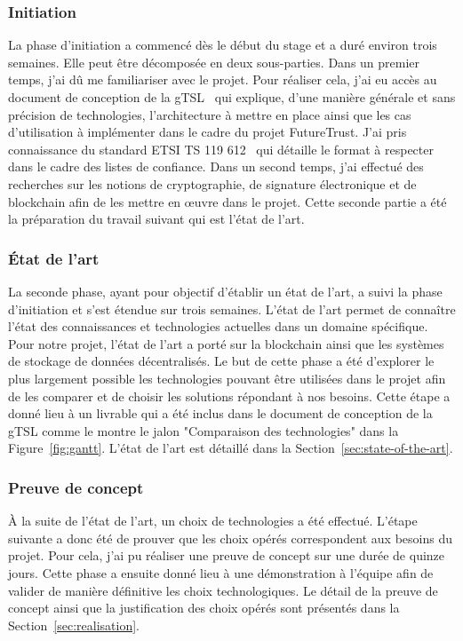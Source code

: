 \documentclass{tnreport}
\begin{document}
\subsubsection{Initiation}

La phase d'initiation a commencé dès le début du stage et a duré environ trois semaines. 
Elle peut être décomposée en deux sous-parties. Dans un premier temps, j'ai dû me familiariser avec le projet. Pour réaliser cela, j'ai eu accès au document de conception de la gTSL~\cite{design-document} qui explique, d'une manière générale et sans précision de technologies, l'architecture à mettre en place ainsi que les cas d'utilisation à implémenter dans le cadre du projet FutureTrust. J'ai pris connaissance du standard ETSI TS 119 612~\cite{ETSITS119612} qui détaille le format à respecter dans le cadre des listes de confiance. Dans un second temps, j'ai effectué des recherches sur les notions de cryptographie, de signature électronique et de blockchain afin de les mettre en œuvre dans le projet. Cette seconde partie a été la préparation du travail suivant qui est l'état de l'art.

\subsubsection{État de l'art}

La seconde phase, ayant pour objectif d'établir un état de l'art, a suivi la phase d'initiation et s'est étendue sur trois semaines.
L'état de l'art permet de connaître l'état des connaissances et technologies actuelles dans un domaine spécifique. Pour notre projet, l'état de l'art a porté sur la blockchain ainsi que les systèmes de stockage de données décentralisés. Le but de cette phase a été d'explorer le plus largement possible les technologies pouvant être utilisées dans le projet afin de les comparer et de choisir les solutions répondant à nos besoins. Cette étape a donné lieu à un livrable qui a été inclus dans le document de conception de la gTSL comme le montre le jalon "Comparaison des technologies" dans la Figure~\ref{fig:gantt}. L'état de l'art est détaillé dans la Section~\ref{sec:state-of-the-art}.

\subsubsection{Preuve de concept}

À la suite de l'état de l'art, un choix de technologies a été effectué. L'étape suivante a donc été de prouver que les choix opérés correspondent aux besoins du projet. Pour cela, j'ai pu réaliser une preuve de concept sur une durée de quinze jours. Cette phase a ensuite donné lieu à une démonstration à l'équipe afin de valider de manière définitive les choix technologiques. Le détail de la preuve de concept ainsi que la justification des choix opérés sont présentés dans la Section~\ref{sec:realisation}.
\end{document}

